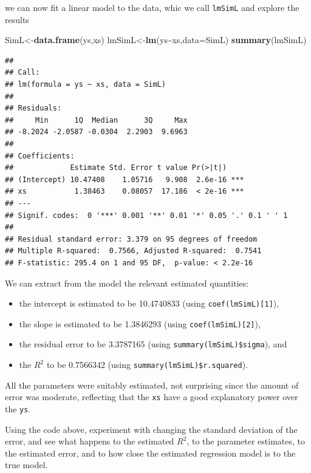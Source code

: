 \documentclass[
]{book}
\newenvironment{Shaded}{\begin{snugshade}}{\end{snugshade}}
\newcommand{\AttributeTok}[1]{\textcolor[rgb]{0.13,0.29,0.53}{#1}}
\newcommand{\FunctionTok}[1]{\textcolor[rgb]{0.13,0.29,0.53}{\textbf{#1}}}
\newcommand{\NormalTok}[1]{#1}
\newcommand{\OtherTok}[1]{\textcolor[rgb]{0.56,0.35,0.01}{#1}}
\newcommand{\SpecialCharTok}[1]{\textcolor[rgb]{0.81,0.36,0.00}{\textbf{#1}}}
\providecommand{\tightlist}{%
  \setlength{\itemsep}{0pt}\setlength{\parskip}{0pt}}
\begin{document}
we can now fit a linear model to the data, whic we call \texttt{lmSimL} and explore the results

\begin{Shaded}
\begin{Highlighting}[]
\NormalTok{SimL}\OtherTok{\textless{}{-}}\FunctionTok{data.frame}\NormalTok{(ys,xs)}
\NormalTok{lmSimL}\OtherTok{\textless{}{-}}\FunctionTok{lm}\NormalTok{(ys}\SpecialCharTok{\textasciitilde{}}\NormalTok{xs,}\AttributeTok{data=}\NormalTok{SimL)}
\FunctionTok{summary}\NormalTok{(lmSimL)}
\end{Highlighting}
\end{Shaded}

\begin{verbatim}
## 
## Call:
## lm(formula = ys ~ xs, data = SimL)
## 
## Residuals:
##     Min      1Q  Median      3Q     Max 
## -8.2024 -2.0587 -0.0304  2.2903  9.6963 
## 
## Coefficients:
##             Estimate Std. Error t value Pr(>|t|)    
## (Intercept) 10.47408    1.05716   9.908  2.6e-16 ***
## xs           1.38463    0.08057  17.186  < 2e-16 ***
## ---
## Signif. codes:  0 '***' 0.001 '**' 0.01 '*' 0.05 '.' 0.1 ' ' 1
## 
## Residual standard error: 3.379 on 95 degrees of freedom
## Multiple R-squared:  0.7566, Adjusted R-squared:  0.7541 
## F-statistic: 295.4 on 1 and 95 DF,  p-value: < 2.2e-16
\end{verbatim}

We can extract from the model the relevant estimated quantities:

\begin{itemize}
\tightlist
\item
  the intercept is estimated to be 10.4740833 (using \texttt{coef(lmSimL){[}1{]}}),
\item
  the slope is estimated to be 1.3846293 (using \texttt{coef(lmSimL){[}2{]}}),
\item
  the residual error to be 3.3787165 (using \texttt{summary(lmSimL)\$sigma}), and
\item
  the \(R^2\) to be 0.7566342 (using \texttt{summary(lmSimL)\$r.squared}).
\end{itemize}

All the parameters were suitably estimated, not surprising since the amount of error was moderate, reflecting that the \texttt{xs} have a good explanatory power over the \texttt{ys}.

Using the code above, experiment with changing the standard deviation of the error, and see what happens to the estimated \(R^2\), to the parameter estimates, to the estimated error, and to how close the estimated regression model is to the true model.
\end{document}
